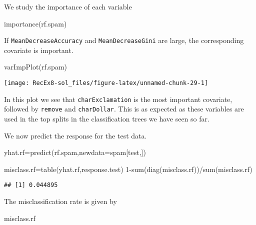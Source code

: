 \documentclass[
]{article}
\newenvironment{Shaded}{\begin{snugshade}}{\end{snugshade}}
\newcommand{\AttributeTok}[1]{\textcolor[rgb]{0.77,0.63,0.00}{#1}}
\newcommand{\DecValTok}[1]{\textcolor[rgb]{0.00,0.00,0.81}{#1}}
\newcommand{\FunctionTok}[1]{\textcolor[rgb]{0.00,0.00,0.00}{#1}}
\newcommand{\NormalTok}[1]{#1}
\newcommand{\OtherTok}[1]{\textcolor[rgb]{0.56,0.35,0.01}{#1}}
\newcommand{\SpecialCharTok}[1]{\textcolor[rgb]{0.00,0.00,0.00}{#1}}
\begin{document}
We study the importance of each variable

\begin{Shaded}
\begin{Highlighting}[]
\FunctionTok{importance}\NormalTok{(rf.spam)}
\end{Highlighting}
\end{Shaded}

If \texttt{MeanDecreaseAccuracy} and \texttt{MeanDecreaseGini} are
large, the corresponding covariate is important.

\begin{Shaded}
\begin{Highlighting}[]
\FunctionTok{varImpPlot}\NormalTok{(rf.spam)}
\end{Highlighting}
\end{Shaded}

\texttt{[image: RecEx8-sol\_files/figure-latex/unnamed-chunk-29-1]}

In this plot we see that \texttt{charExclamation} is the most important
covariate, followed by \texttt{remove} and \texttt{charDollar}. This is
as expected as these variables are used in the top splits in the
classification trees we have seen so far.

We now predict the response for the test data.

\begin{Shaded}
\begin{Highlighting}[]
\NormalTok{yhat.rf}\OtherTok{=}\FunctionTok{predict}\NormalTok{(rf.spam,}\AttributeTok{newdata=}\NormalTok{spam[test,])}

\NormalTok{misclass.rf}\OtherTok{=}\FunctionTok{table}\NormalTok{(yhat.rf,response.test)}
\DecValTok{1}\SpecialCharTok{{-}}\FunctionTok{sum}\NormalTok{(}\FunctionTok{diag}\NormalTok{(misclass.rf))}\SpecialCharTok{/}\FunctionTok{sum}\NormalTok{(misclass.rf)}
\end{Highlighting}
\end{Shaded}

\begin{verbatim}
## [1] 0.044895
\end{verbatim}

The misclassification rate is given by

\begin{Shaded}
\begin{Highlighting}[]
\NormalTok{misclass.rf}
\end{Highlighting}
\end{Shaded}
\end{document}
